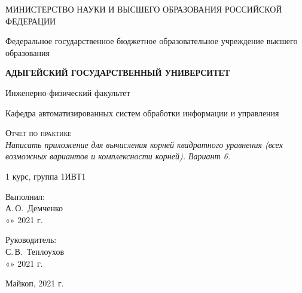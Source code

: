 \documentclass[12pt,a4paper]{scrartcl}
\begin{document}
		\begin{titlepage}
		\begin{center}
			\large
			МИНИСТЕРСТВО НАУКИ И ВЫСШЕГО ОБРАЗОВАНИЯ РОССИЙСКОЙ ФЕДЕРАЦИИ
			
			Федеральное государственное бюджетное образовательное учреждение высшего образования
			
			\textbf{АДЫГЕЙСКИЙ ГОСУДАРСТВЕННЫЙ УНИВЕРСИТЕТ}
			\vspace{0.25cm}
			
			Инженерно-физический факультет
			
			Кафедра автоматизированных систем обработки информации и управления
			\vfill

			\vfill
			
			\textsc{Отчет по практике}\\[5mm]
			
			{\LARGE \textit{Написать приложение для вычисления корней квадратного уравнения (всех возможных вариантов и комплексности корней). Вариант 6.}}
			\bigskip
			
			1 курс, группа 1ИВТ1
		\end{center}
		\vfill
		
		\newlength{\ML}
		\hfill\begin{minipage}{0.5\textwidth}
			Выполнил:\\
			\underline{\hspace{\ML}} А.\,О.~Демченко\\
			«\underline{\hspace{0.7cm}}» \underline{\hspace{2cm}} 2021 г.
		\end{minipage}%
		\bigskip
		
		\hfill\begin{minipage}{0.5\textwidth}
			Руководитель:\\
			\underline{\hspace{\ML}} С.\,В.~Теплоухов\\
			«\underline{\hspace{0.7cm}}» \underline{\hspace{2cm}} 2021 г.
		\end{minipage}%
		\vfill
		
		\begin{center}
			Майкоп, 2021 г.
		\end{center}
	\end{titlepage}
\end{document}
